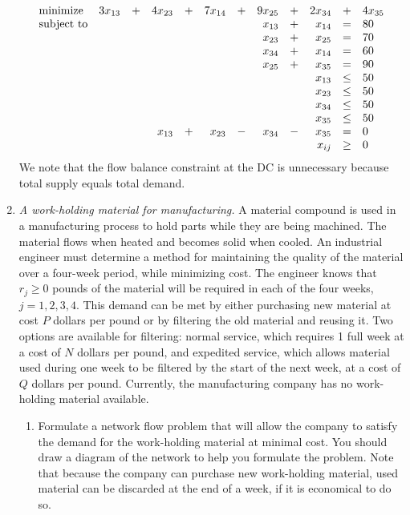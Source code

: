 \begin{enumerate}
\begin{solution}
\[
\begin{array}{lrrrrrrrrrrl}
\textrm{minimize} & 3x_{13} &+& 4x_{23} &+& 7x_{14} &+& 9x_{25} &+& 2x_{34} &+& 4x_{35} \\
\textrm{subject to} &&&&&&& x_{13} &+& x_{14} &=& 80\\
&&&&&&& x_{23} &+& x_{25} &=& 70\\
&&&&&&& x_{34} &+& x_{14} &=& 60\\
&&&&&&& x_{25} &+& x_{35} &=& 90\\
&&&&&&&&& x_{13} & \leq & 50\\
&&&&&&&&& x_{23} & \leq & 50\\
&&&&&&&&& x_{34} & \leq & 50\\
&&&&&&&&& x_{35} & \leq & 50\\
&&& x_{13} &+& x_{23} &-& x_{34} &-& x_{35} &=& 0\\
\multicolumn{10}{r}{x_{ij}} & \geq & 0
\end{array}
\]
We note that the flow balance constraint at the DC is unnecessary
because total supply equals total demand.
\end{solution}

\item \emph{A work-holding material for manufacturing.}  A
  material compound is used in a manufacturing process to hold parts
  while they are being machined.  The material flows when heated and
  becomes solid when cooled. An industrial engineer must determine a
  method for maintaining the quality of the material over a four-week
  period, while minimizing cost. The engineer knows that $r_j \geq 0$
  pounds of the material will be required in each of the four weeks,
  $j = 1, 2, 3, 4$. This demand can be met by either purchasing new
  material at cost $P$ dollars per pound or by filtering the old
  material and reusing it.  Two options are available for filtering:
  normal service, which requires 1 full week at a cost of $N$ dollars
  per pound, and expedited service, which allows material used during
  one week to be filtered by the start of the next week, at a cost of
  $Q$ dollars per pound. Currently, the manufacturing company has no
  work-holding material available.

\begin{enumerate}
\item Formulate a network flow problem that will allow the company to
  satisfy the demand for the work-holding material at minimal cost.
  You should draw a diagram of the network to help you formulate the
  problem. Note that because the company can purchase new work-holding
  material, used material can be discarded at the end of a week, if it
  is economical to do so.
	

\end{enumerate}
\end{enumerate}

